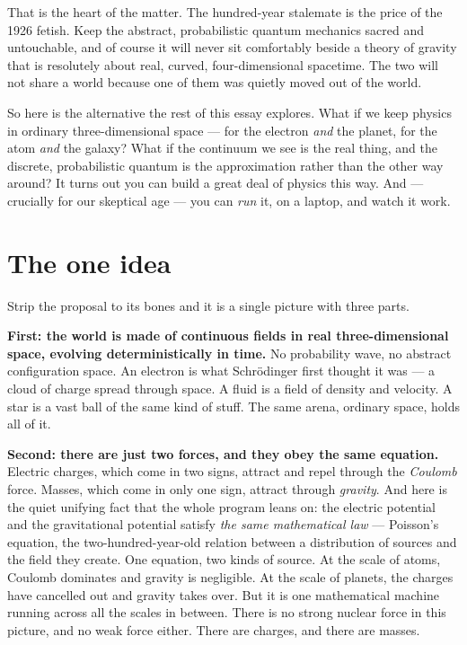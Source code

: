 \documentclass[11pt]{article}
\begin{document}
That is the heart of the matter. The hundred-year stalemate is the price of the 1926 fetish. Keep
the abstract, probabilistic quantum mechanics sacred and untouchable, and of course it will never
sit comfortably beside a theory of gravity that is resolutely about real, curved, four-dimensional
spacetime. The two will not share a world because one of them was quietly moved out of the world.

So here is the alternative the rest of this essay explores. What if we keep physics in ordinary
three-dimensional space --- for the electron \emph{and} the planet, for the atom \emph{and} the
galaxy? What if the continuum we see is the real thing, and the discrete, probabilistic quantum is
the approximation rather than the other way around? It turns out you can build a great deal of
physics this way. And --- crucially for our skeptical age --- you can \emph{run} it, on a laptop,
and watch it work.

\section*{The one idea}

Strip the proposal to its bones and it is a single picture with three parts.

\textbf{First: the world is made of continuous fields in real three-dimensional space, evolving
deterministically in time.} No probability wave, no abstract configuration space. An electron is
what Schr\"odinger first thought it was --- a cloud of charge spread through space. A fluid is a
field of density and velocity. A star is a vast ball of the same kind of stuff. The same arena,
ordinary space, holds all of it.

\textbf{Second: there are just two forces, and they obey the same equation.} Electric charges,
which come in two signs, attract and repel through the \emph{Coulomb} force. Masses, which come in
only one sign, attract through \emph{gravity}. And here is the quiet unifying fact that the whole
program leans on: the electric potential and the gravitational potential satisfy \emph{the same
mathematical law} --- Poisson's equation, the two-hundred-year-old relation between a distribution
of sources and the field they create. One equation, two kinds of source. At the scale of atoms,
Coulomb dominates and gravity is negligible. At the scale of planets, the charges have cancelled
out and gravity takes over. But it is one mathematical machine running across all the scales in
between. There is no strong nuclear force in this picture, and no weak force either. There are
charges, and there are masses.
\end{document}
